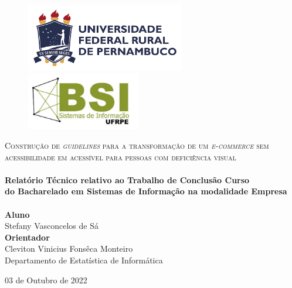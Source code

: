 \begin{titlepage}
\begin{center}


\begin{figure}[ht]
		\includegraphics[height=3cm]{images/logo_ufrpe_horizontal.png}
		\hspace{3.5cm}
    	\includegraphics[height=2.5cm]{images/logo_bsi .pdf}
	\end{figure}   

\vspace{1cm}

\textsc{\large Construção de \textit{guidelines} para a transformação de um \textit{e-commerce} sem acessibilidade em acessível para pessoas com deficiência visual} \\


\HRule \\[0.4cm]
{\large \bfseries Relatório Técnico relativo ao Trabalho de Conclusão Curso \\
do Bacharelado em Sistemas de Informação na modalidade Empresa \\[0.4cm]}
\HRule 
\\[2cm]

\large\textbf{Aluno}\\
Stefany Vasconcelos de Sá\\[1cm]

\large\textbf{Orientador}\\
Cleviton Vinicius Fonsêca Monteiro\\
Departamento de Estatística de Informática\\[1cm]




\vfill

{\large 03 de Outubro de 2022}
\end{center}


\end{titlepage}
